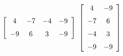 {$\left[ \begin {array}{cccc} 4&-7&-4&-9\\\noalign{\medskip}-9&6&3&-9
\end {array} \right] $}
{$\left[ \begin {array}{cc} 4&-9\\\noalign{\medskip}-7&6
\\\noalign{\medskip}-4&3\\\noalign{\medskip}-9&-9\end {array} \right]$}

